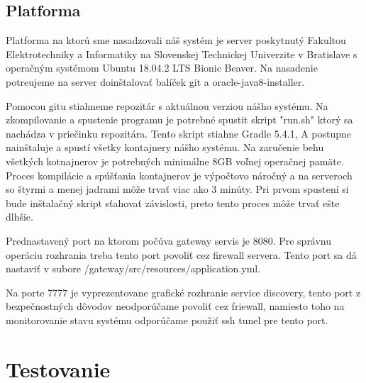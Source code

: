\subsection{Platforma}
Platforma na ktorú sme nasadzovali náš systém je server poskytnutý Fakultou Elektrotechniky a Informatiky na Slovenskej Technickej Univerzite v Bratislave s operačným systémom Ubuntu 18.04.2 LTS Bionic Beaver. Na nasadenie potreujeme na server doinštalovať balíček git a oracle-java8-installer. 

Pomocou gitu stiahneme repozitár \cite{dp_repo} s aktuálnou verziou nášho systému. Na zkompilovanie a spustenie programu je potrebné spustit skript "run.sh" ktorý sa nachádza v priečinku repozitára. Tento skript stiahne Gradle 5.4.1, A postupne nainštaluje a spustí všetky kontajnery nášho systému. Na zaručenie behu všetkých kotnajnerov je potrebných minimálne 8GB voľnej operačnej pamäte. Proces kompilácie a spúšťania kontajnerov je výpočtovo náročný a na serveroch so štyrmi a menej jadrami môže trvať viac ako 3 minúty. Pri prvom spustení si bude inštalačný skript sťahovať závislosti, preto tento proces môže trvať ešte dlhšie. 

Prednastavený port na ktorom počúva gateway servis je 8080. Pre správnu operáciu rozhrania treba tento port povoliť cez firewall servera. Tento port sa dá nastaviť v subore /gateway/src/resources/application.yml.

Na porte 7777 je vyprezentovane grafické rozhranie service discovery, tento port z bezpečnostných dôvodov neodporúčame povoliť cez friewall, namiesto toho na monitorovanie stavu systému odporúčame použiť ssh tunel pre tento port.
 

\section{Testovanie} 
 




